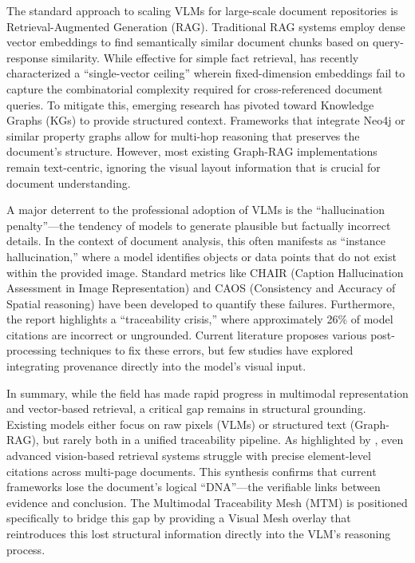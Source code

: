 \documentclass[11pt]{article}
\begin{document}
The standard approach to scaling VLMs for large-scale document repositories is Retrieval-Augmented Generation (RAG). Traditional RAG systems employ dense vector embeddings to find semantically similar document chunks based on query-response similarity. While effective for simple fact retrieval, \citet{DeepMind2025} has recently characterized a ``single-vector ceiling'' wherein fixed-dimension embeddings fail to capture the combinatorial complexity required for cross-referenced document queries. To mitigate this, emerging research has pivoted toward Knowledge Graphs (KGs) to provide structured context. Frameworks that integrate Neo4j or similar property graphs allow for multi-hop reasoning that preserves the document's structure. However, most existing Graph-RAG implementations remain text-centric, ignoring the visual layout information that is crucial for document understanding.

A major deterrent to the professional adoption of VLMs is the ``hallucination penalty''---the tendency of models to generate plausible but factually incorrect details. In the context of document analysis, this often manifests as ``instance hallucination,'' where a model identifies objects or data points that do not exist within the provided image. Standard metrics like CHAIR (Caption Hallucination Assessment in Image Representation) and CAOS (Consistency and Accuracy of Spatial reasoning) have been developed to quantify these failures. Furthermore, the \citet{CiteFix2025} report highlights a ``traceability crisis,'' where approximately 26\% of model citations are incorrect or ungrounded. Current literature proposes various post-processing techniques to fix these errors, but few studies have explored integrating provenance directly into the model's visual input.

In summary, while the field has made rapid progress in multimodal representation and vector-based retrieval, a critical gap remains in structural grounding. Existing models either focus on raw pixels (VLMs) or structured text (Graph-RAG), but rarely both in a unified traceability pipeline. As highlighted by \citet{ColPali2024}, even advanced vision-based retrieval systems struggle with precise element-level citations across multi-page documents. This synthesis confirms that current frameworks lose the document's logical ``DNA''---the verifiable links between evidence and conclusion. The Multimodal Traceability Mesh (MTM) is positioned specifically to bridge this gap by providing a Visual Mesh overlay that reintroduces this lost structural information directly into the VLM's reasoning process.
\end{document}
